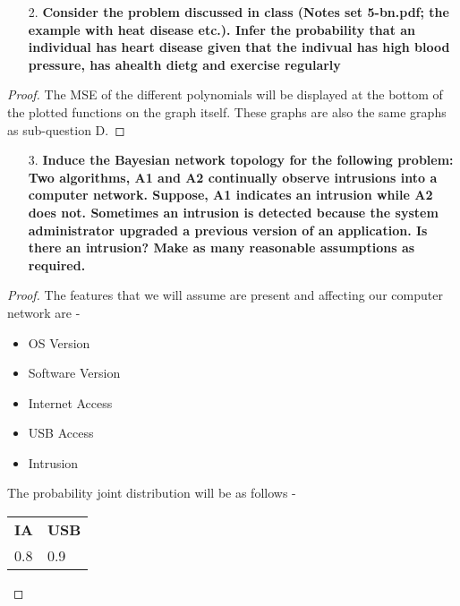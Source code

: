 \documentclass{article}
\theoremstyle{case}
\begin{document}
\begin{enumerate}
    \item [2.] \textbf{Consider the problem discussed in class (Notes set 5-bn.pdf; the example
with heat disease etc.). Infer the probability that an individual has heart
disease given that the indivual has high blood pressure, has ahealth dietg
and exercise regularly}
\end{enumerate}
\begin{proof}
The MSE of the different polynomials will be displayed at the bottom of the plotted functions on the graph itself. These graphs are also the same graphs as sub-question D.

\end{proof}
\begin{enumerate}
    \item [3.] \textbf{Induce the Bayesian network topology for the following problem: Two
algorithms, A1 and A2 continually observe intrusions into a computer
network. Suppose, A1 indicates an intrusion while A2 does not. Sometimes
an intrusion is detected because the system administrator upgraded a
previous version of an application. Is there an intrusion? Make as many
reasonable assumptions as required.}
\end{enumerate} 
\begin{proof} 
The features that we will assume are present and affecting our computer network are - 
\begin{itemize}
  \item OS Version
  \item Software Version
  \item Internet Access
  \item USB Access
  \item Intrusion
\end{itemize}
The probability joint distribution will be as follows -
\begin{table}[]
\begin{tabular}{ll}
\textbf{IA} & \textbf{USB} \\
0.8 & 0.9
\end{tabular}
\end{table}
\end{proof}
\end{document}
